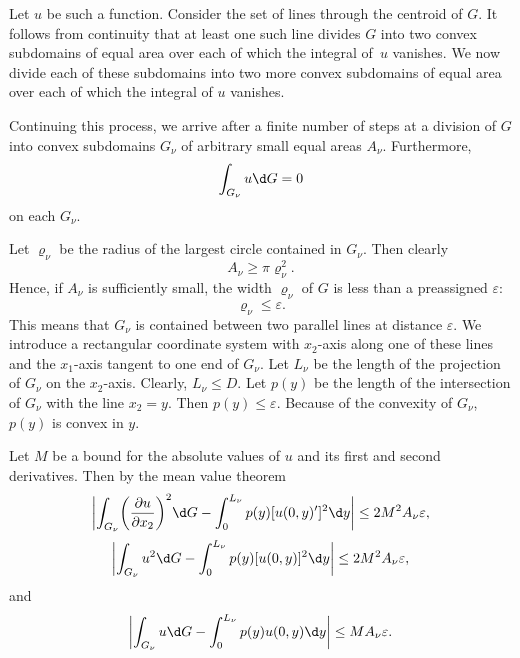 \documentclass{article}
\theoremstyle{remarks}
\begin{document}
Let $u$ be such a function. Consider the set of lines through the centroid
of $G$. It follows from continuity that at least one such line divides $G$
into two convex subdomains of equal area over each of which the integral of~$u$
vanishes. We now divide each of these subdomains into two more convex subdomains
of equal area over each of which the integral of $u$ vanishes.

Continuing this process, we arrive after a finite number of steps at a division
of $G$ into convex subdomains $G_\nu$ of arbitrary small equal areas $A_\nu$.
Furthermore,
\begin{equation}\label{eq:3.3}
  \int_{G_\nu} u \d G = 0
\end{equation}
on each $G_\nu$.

Let $\varrho_\nu$ be the radius of the largest circle contained in $G_\nu$.
Then clearly
\begin{equation}\label{eq:3.4}
  A_\nu \geq \pi \varrho_\nu^2.
\end{equation}
Hence, if $A_\nu$ is sufficiently small, the width $\varrho_\nu$ of $G$
is less than a preassigned $\varepsilon$:
\begin{equation}\label{eq:3.5}
  \varrho_\nu \leq \varepsilon.
\end{equation}
This means that $G_\nu$ is contained between two parallel lines at distance $\varepsilon$.
We introduce a rectangular coordinate system with $x_2$-axis along one of these lines
and the $x_1$-axis tangent to one end of $G_\nu$.
Let $L_\nu$ be the length of the projection of $G_\nu$ on the $x_2$-axis.
Clearly, $L_\nu\leq D$. Let $p(y)$ be the length of the intersection
of $G_\nu$ with the line $x_2=y$. Then $p(y)\leq\varepsilon$.
Because of the convexity of $G_\nu$, $p(y)$ is convex in $y$.

Let $M$ be a bound for the absolute values of $u$ and its first and second
derivatives. Then by the mean value theorem
\begin{equation}\label{eq:3.6}
  \biggl|\int_{G_\nu} \biggl(\frac{\partial u}{\partial x_2}\biggr)^2 \d G
  - \int_0^{L_\nu} p(y) [u(0,y)']^2 \d y \biggr|
  \leq 2M^2 A_{\nu} \varepsilon,
\end{equation}
\begin{equation}\label{eq:3.7}
  \biggl|\int_{G_\nu} u^2 \d G - \int_0^{L_\nu} p(y) [u(0,y)]^2 \d y\biggr|
  \leq 2M^2 A_\nu \varepsilon,
\end{equation}
and
\begin{equation}\label{eq:3.8}
  \biggl|\int_{G_\nu} u \d G - \int_0^{L_\nu} p(y) u(0,y) \d y\biggr|
  \leq M A_\nu \varepsilon.
\end{equation}
\end{document}
